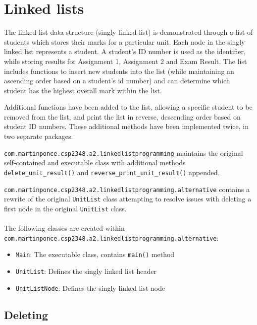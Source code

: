 \newpage
\section{Linked lists}

The linked list data structure (singly linked list) is demonstrated through a list of students which stores their marks for a particular unit. Each node in the singly linked list represents a student. A student's ID number is used as the identifier, while storing results for Assignment 1, Assignment 2 and Exam Result. The list includes functions to insert new students into the list (while maintaining an ascending order based on a student's id number) and can determine which student has the highest overall mark within the list.

Additional functions have been added to the list, allowing a specific student to be removed from the list, and print the list in reverse, descending order based on student ID numbers. These additional methods have been implemented twice, in two separate packages.

\texttt{com.martinponce.csp2348.a2.linkedlistprogramming} maintains the original self-contained and executable class with additional methods \texttt{delete_unit_result()} and \texttt{reverse_print_unit_result()} appended.

\texttt{com.martinponce.csp2348.a2.linkedlistprogramming.alternative} contains a rewrite of the original \texttt{UnitList} class attempting to resolve issues with deleting a first node in the original \texttt{UnitList} class.
\\
\\
The following classes are created within \\
\texttt{com.martinponce.csp2348.a2.linkedlistprogramming.alternative}:

\begin{itemize}
\item \texttt{Main}: The executable class, contains \texttt{main()} method
\item \texttt{UnitList}: Defines the singly linked list header
\item \texttt{UnitListNode}: Defines the singly linked list node
\end{itemize}

\subsection{Deleting}

